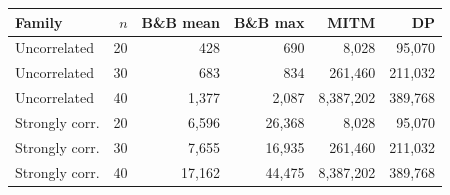 \begin{tabular}{@{}l r r r r r@{}}
\toprule
Family & $n$ & B\&B mean & B\&B max & MITM & DP\\
\midrule
Uncorrelated & 20 & 428 & 690 & 8,028 & 95,070\\
Uncorrelated & 30 & 683 & 834 & 261,460 & 211,032\\
Uncorrelated & 40 & 1,377 & 2,087 & 8,387,202 & 389,768\\
\midrule
Strongly corr. & 20 & 6,596 & 26,368 & 8,028 & 95,070\\
Strongly corr. & 30 & 7,655 & 16,935 & 261,460 & 211,032\\
Strongly corr. & 40 & 17,162 & 44,475 & 8,387,202 & 389,768\\
\bottomrule
\end{tabular}
